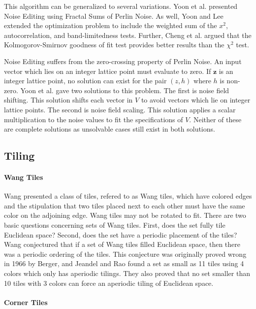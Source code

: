 \documentclass[12pt]{article}
\theoremstyle{definition}
\theoremstyle{remark}
\begin{document}
This algorithm can be generalized to several variations. Yoon et al. presented Noise Editing using Fractal Sums of Perlin Noise. As well, Yoon and Lee\cite{yoonlee2008} extended the optimization problem to include the weighted sum of the $x^2$, autocorrelation, and band-limitedness tests. Further, Cheng et al.\cite{cheng2014} argued that the Kolmogorov-Smirnov goodness of fit test provides better results than the $\chi^2$ test.

Noise Editing suffers from the zero-crossing property of Perlin Noise. An input vector which lies on an integer lattice point must evaluate to zero. If $\textbf{z}$ is an integer lattice point, no solution can exist for the pair $(z, h)$ where $h$ is non-zero. Yoon et al. gave two solutions to this problem. The first is noise field shifting. This solution shifts each vector in $V$ to avoid vectors which lie on integer lattice points. The second is noise field scaling. This solution applies a scalar multiplication to the noise values to fit the specifications of $V$. Neither of these are complete solutions as unsolvable cases still exist in both solutions.

\subsection{Tiling}

\paragraph{Wang Tiles}

Wang\cite{wang1961} presented a class of tiles, refered to as Wang tiles, which have colored edges and the stipulation that two tiles placed next to each other must have the same color on the adjoining edge. Wang tiles may not be rotated to fit. There are two basic questions concerning sets of Wang tiles. First, does the set fully tile Euclidean space? Second, does the set have a periodic placement of the tiles? Wang conjectured that if a set of Wang tiles filled Euclidean space, then there was a periodic ordering of the tiles. This conjecture was originally proved wrong in 1966 by Berger\cite{berger1966}, and Jeandel and Rao\cite{jeandelrao2015} found a set as small as 11 tiles using 4 colors which only has aperiodic tilings. They also proved that no set smaller than 10 tiles with 3 colors can force an aperiodic tiling of Euclidean space.

\paragraph{Corner Tiles}
\end{document}
